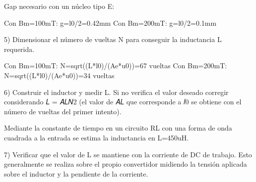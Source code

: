 Gap necesario con un núcleo tipo E:

Con Bm=100mT:
g=l0/2=0.42mm
Con Bm=200mT:
g=l0/2=0.1mm

5) Dimensionar el número de vueltas N para conseguir la inductancia L requerida.

Con Bm=100mT:
N=sqrt((L*l0)/(Ae*u0))=67 vueltas
Con Bm=200mT:
N=sqrt((L*l0)/(Ae*u0))=34 vueltas

6) Construir el inductor y medir L. Si no verifica el valor deseado corregir
considerando 𝐿 = 𝐴𝐿𝑁2 (el valor de 𝐴𝐿 que corresponde a 𝑙0 se obtiene con
el número de vueltas del primer intento).

Mediante la constante de tiempo en un circuito RL con una forma de onda cuadrada a la entrada se estima la inductancia en L=450uH. 

7) Verificar que el valor de L se mantiene con la corriente de DC de trabajo.
Esto generalmente se realiza sobre el propio convertidor midiendo la
tensión aplicada sobre el inductor y la pendiente de la corriente.